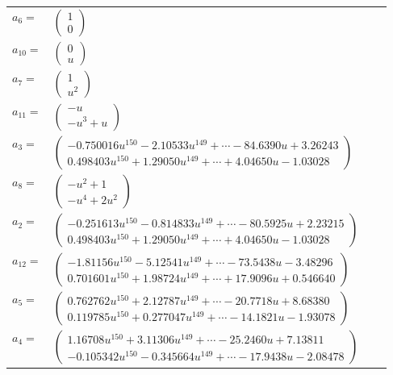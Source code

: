 \documentclass[1p]{elsarticle_modified}
\theoremstyle{definition}
\begin{document}
\begin{tabular}{m{7pt} m{180pt} m{7pt} m{180pt} }
\flushright $a_{6}=$&$\begin{pmatrix}1\\0\end{pmatrix}$ \\
\flushright $a_{10}=$&$\begin{pmatrix}0\\u\end{pmatrix}$ \\
\flushright $a_{7}=$&$\begin{pmatrix}1\\u^2\end{pmatrix}$ \\
\flushright $a_{11}=$&$\begin{pmatrix}- u\\- u^3+u\end{pmatrix}$ \\
\flushright $a_{3}=$&$\begin{pmatrix}-0.750016 u^{150}-2.10533 u^{149}+\cdots-84.6390 u+3.26243\\0.498403 u^{150}+1.29050 u^{149}+\cdots+4.04650 u-1.03028\end{pmatrix}$ \\
\flushright $a_{8}=$&$\begin{pmatrix}- u^2+1\\- u^4+2 u^2\end{pmatrix}$ \\
\flushright $a_{2}=$&$\begin{pmatrix}-0.251613 u^{150}-0.814833 u^{149}+\cdots-80.5925 u+2.23215\\0.498403 u^{150}+1.29050 u^{149}+\cdots+4.04650 u-1.03028\end{pmatrix}$ \\
\flushright $a_{12}=$&$\begin{pmatrix}-1.81156 u^{150}-5.12541 u^{149}+\cdots-73.5438 u-3.48296\\0.701601 u^{150}+1.98724 u^{149}+\cdots+17.9096 u+0.546640\end{pmatrix}$ \\
\flushright $a_{5}=$&$\begin{pmatrix}0.762762 u^{150}+2.12787 u^{149}+\cdots-20.7718 u+8.68380\\0.119785 u^{150}+0.277047 u^{149}+\cdots-14.1821 u-1.93078\end{pmatrix}$ \\
\flushright $a_{4}=$&$\begin{pmatrix}1.16708 u^{150}+3.11306 u^{149}+\cdots-25.2460 u+7.13811\\-0.105342 u^{150}-0.345664 u^{149}+\cdots-17.9438 u-2.08478\end{pmatrix}$ \\

\end{tabular}
\end{document}
